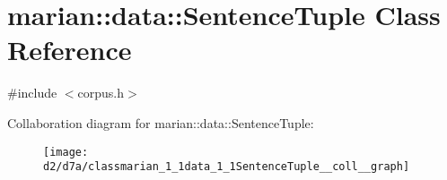 \hypertarget{classmarian_1_1data_1_1SentenceTuple}{}\section{marian\+:\+:data\+:\+:Sentence\+Tuple Class Reference}
\label{classmarian_1_1data_1_1SentenceTuple}


{\ttfamily \#include $<$corpus.\+h$>$}



Collaboration diagram for marian\+:\+:data\+:\+:Sentence\+Tuple\+:
\nopagebreak
\begin{figure}[H]
\begin{center}
\leavevmode
\texttt{[image: d2/d7a/classmarian\_1\_1data\_1\_1SentenceTuple\_\_coll\_\_graph]}
\end{center}
\end{figure}
